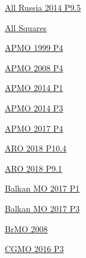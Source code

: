 \hyperref  [problem:]{}

\hyperref  [problem:]{}

\hyperref  [problem:]{}

\hyperref  [problem:]{}

\hyperref  [problem:]{}

\hyperref  [problem:]{}

\hyperref  [problem:]{}

\hyperref  [problem:]{}

\hyperref  [problem:]{}

\hyperref  [problem:]{}

\hyperref  [problem:]{}

\hyperref  [problem:]{}

\hyperref  [problem:]{}

\hyperref  [problem:]{}

\hyperref  [problem:]{}

\hyperref  [problem:]{}

\hyperref  [problem:]{}

\hyperref  [problem:]{}

\hyperref  [problem:]{}

\hyperref  [problem:]{}

\hyperref  [problem:]{}

\hyperref  [problem:]{}

\hyperref  [problem:]{}

\hyperref  [problem:All Russia 2014 P9.5]{All Russia 2014 P9.5}

\hyperref  [problem:All Squares]{All Squares}

\hyperref  [problem:APMO 1999 P4]{APMO 1999 P4}

\hyperref  [problem:APMO 2008 P4]{APMO 2008 P4}

\hyperref  [problem:APMO 2014 P1]{APMO 2014 P1}

\hyperref  [problem:APMO 2014 P3]{APMO 2014 P3}

\hyperref  [problem:APMO 2017 P4]{APMO 2017 P4}

\hyperref  [problem:ARO 2018 P10.4]{ARO 2018 P10.4}

\hyperref  [problem:ARO 2018 P9.1]{ARO 2018 P9.1}

\hyperref  [problem:Balkan MO 2017 P1]{Balkan MO 2017 P1}

\hyperref  [problem:Balkan MO 2017 P3]{Balkan MO 2017 P3}

\hyperref  [problem:BrMO 2008]{BrMO 2008}

\hyperref  [problem:CGMO 2016 P3]{CGMO 2016 P3}

